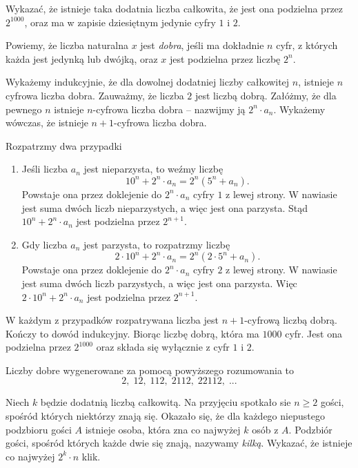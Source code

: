 \begin{problem}{3}
	Wykazać, że istnieje taka dodatnia liczba całkowita, że jest ona podzielna przez $2^{1000}$, oraz ma w zapisie dziesiętnym jedynie cyfry $1$ i $2$.
\end{problem}

\noindent
Powiemy, że liczba naturalna $x$ jest \textit{dobra}, jeśli ma dokładnie $n$ cyfr, z których każda jest jedynką lub dwójką, oraz $x$ jest podzielna przez liczbę $2^n$. 

\vspace{5px}
\noindent
Wykażemy indukcyjnie, że dla dowolnej dodatniej liczby całkowitej $n$, istnieje $n$ cyfrowa liczba dobra. Zauważmy, że liczba $2$ jest liczbą dobrą. Załóżmy, że dla pewnego $n$ istnieje $n$-cyfrowa liczba dobra -- nazwijmy ją $2^n \cdot a_n$. Wykażemy wówczas, że istnieje $n + 1$-cyfrowa liczba dobra.

\vspace{5px}
\noindent
Rozpatrzmy dwa przypadki
\begin{enumerate}
	\item Jeśli liczba $a_n$ jest nieparzysta, to weźmy liczbę 
	\[
		10^{n} + 2^n \cdot a_n = 2^n\left(5^n + a_n\right).
	\]
	Powstaje ona przez doklejenie do $2^n \cdot a_n$ cyfry $1$ z lewej strony.
	W nawiasie jest suma dwóch liczb nieparzystych, a więc jest ona parzysta. Stąd $10^{n} + 2^n \cdot a_n $ jest podzielna przez $2^{n + 1}$.
	\item Gdy liczba $a_n$ jest parzysta, to rozpatrzmy liczbę 
	\[
		2 \cdot 10^{n} + 2^n \cdot a_n = 2^n\left(2 \cdot 5^n + a_n\right).
	\]
	Powstaje ona przez doklejenie do $2^n \cdot a_n$ cyfry $2$ z lewej strony.
	W nawiasie jest suma dwóch liczb parzystych, a więc jest ona parzysta. Więc $2 \cdot 10^{n} + 2^n \cdot a_n $ jest podzielna przez $2^{n + 1}$.
\end{enumerate}
W każdym z przypadków rozpatrywana liczba jest $n + 1$-cyfrową liczbą dobrą. Kończy to dowód indukcyjny. Biorąc liczbę dobrą, która ma $1000$ cyfr. Jest ona podzielna przez $2^{1000}$ oraz składa się wyłącznie z cyfr $1$ i $2$.

\begin{remark}
	Liczby dobre wygenerowane za pomocą powyższego rozumowania to
	\[
		2, \; 12, \; 112, \; 2112, \; 22112, \; ...
	\]
\end{remark}

\begin{problem}{4}
	Niech $k$ będzie dodatnią liczbą całkowitą. Na przyjęciu spotkało sie $n \geqslant 2$ gości, spośród których niektórzy znają się. Okazało się, że dla każdego niepustego podzbioru gości $A$ istnieje osoba, która zna co najwyżej $k$ osób z $A$. Podzbiór gości, spośród których każde dwie się znają, nazywamy \textit{kilką}. Wykazać, że istnieje co najwyżej $2^k \cdot n$ klik.
\end{problem}


